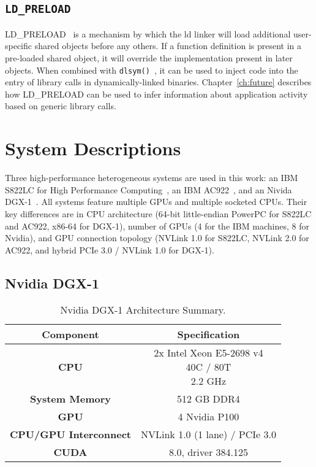 \subsection{\texttt{LD\_PRELOAD}}
\label{sec:ldpreload}

LD\_PRELOAD~\cite{kerrisk2017ld} is a mechanism by which the ld linker will load additional user-specific shared objects before any others.
If a function definition is present in a pre-loaded shared object, it will override the implementation present in later objects.
When combined with \texttt{dlsym()}~\cite{kerrisk2017dlysm}, it can be used to inject code into the entry of library calls in dynamically-linked binaries.
Chapter~\ref{ch:future} describes how LD\_PRELOAD can be used to infer information about application activity based on generic library calls.


\section{System Descriptions}
\label{sec:system-descriptions}

Three high-performance heterogeneous systems are used in this work: an IBM S822LC for High Performance Computing~\cite{caldeira2016s822lc}, an IBM AC922~\cite{caldeira2018ac922}, and an Nivida DGX-1~\cite{nvidia2017dgx1}.
All systems feature multiple GPUs and multiple socketed CPUs.
Their key differences are in CPU architecture (64-bit little-endian PowerPC for S822LC and AC922, x86-64 for DGX-1), number of GPUs (4 for the IBM machines, 8 for Nvidia), and GPU connection topology (NVLink 1.0 for S822LC, NVLink 2.0 for AC922, and hybrid PCIe 3.0 / NVLink 1.0 for DGX-1).

\subsection{Nvidia DGX-1}
\label{sec:dgx1}

\begin{table}[ht]
    \centering
    \caption[Nvidia DGX-1 Architecture Summary]{
		Nvidia DGX-1 Architecture Summary.
	}
    \label{tab:dgx1}
    \begin{tabular}{cc}
    \hline
    \textbf{Component}                     & \textbf{Specification}                                      \\ \hline
    \textbf{CPU}                  & \makecell{2x Intel Xeon E5-2698 v4 \\ 40C / 80T \\ 2.2 GHz} \\ \hline
    \textbf{System Memory}        & 512 GB DDR4                                                 \\ \hline
	\textbf{GPU}                  & 4 Nvidia P100                                               \\ \hline
	\textbf{CPU/GPU Interconnect} & NVLink 1.0 (1 lane) / PCIe 3.0                              \\ \hline
	\textbf{CUDA}                 & 8.0, driver 384.125                                         \\ \hline
    \end{tabular}
\end{table}

